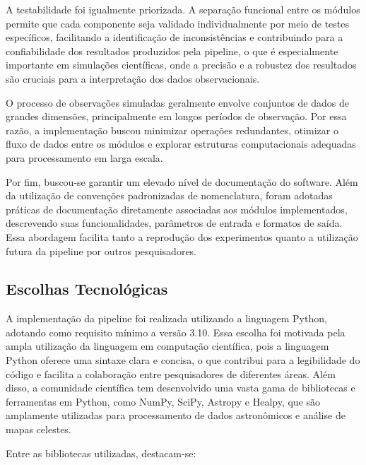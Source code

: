 A testabilidade foi igualmente priorizada. A separação funcional entre os módulos permite que cada componente seja validado individualmente por meio de testes específicos, facilitando a identificação de inconsistências e contribuindo para a confiabilidade dos resultados produzidos pela pipeline, o que é especialmente importante em simulações científicas, onde a precisão e a robustez dos resultados são cruciais para a interpretação dos dados observacionais.

O processo de observações simuladas geralmente envolve conjuntos de dados de grandes dimensões, principalmente em longos períodos de observação. Por essa razão, a implementação buscou minimizar operações redundantes, otimizar o fluxo de dados entre os módulos e explorar estruturas computacionais adequadas para processamento em larga escala.

Por fim, buscou-se garantir um elevado nível de documentação do software. Além da utilização de convenções padronizadas de nomenclatura, foram adotadas práticas de documentação diretamente associadas aos módulos implementados, descrevendo suas funcionalidades, parâmetros de entrada e formatos de saída. Essa abordagem facilita tanto a reprodução dos experimentos quanto a utilização futura da pipeline por outros pesquisadores.

\subsection{Escolhas Tecnológicas}

A implementação da pipeline foi realizada utilizando a linguagem Python, adotando como requisito mínimo a versão 3.10. Essa escolha foi motivada pela ampla utilização da linguagem em computação científica, pois a linguagem Python oferece uma sintaxe clara e concisa, o que contribui para a legibilidade do código e facilita a colaboração entre pesquisadores de diferentes áreas. Além disso, a comunidade científica tem desenvolvido uma vasta gama de bibliotecas e ferramentas em Python, como NumPy, SciPy, Astropy e Healpy, que são amplamente utilizadas para processamento de dados astronômicos e análise de mapas celestes.

Entre as bibliotecas utilizadas, destacam-se:

